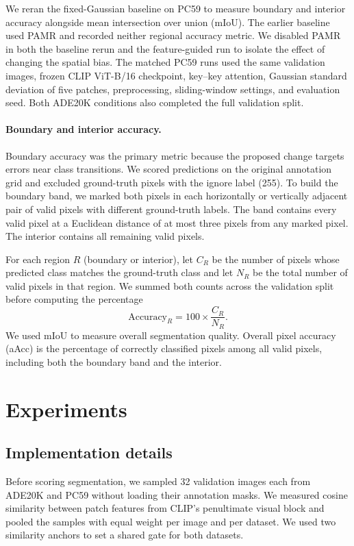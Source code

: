 We reran the fixed-Gaussian baseline on PC59 to measure boundary and interior
accuracy alongside mean intersection over union (mIoU). The earlier baseline
used PAMR and recorded neither regional accuracy metric. We disabled PAMR in
both the baseline rerun and the feature-guided run to isolate the effect of
changing the spatial bias. The matched PC59 runs used the same validation
images, frozen CLIP ViT-B/16 checkpoint, key--key attention, Gaussian standard
deviation of five patches, preprocessing, sliding-window settings, and
evaluation seed. Both ADE20K conditions also completed the full validation
split.

\paragraph{Boundary and interior accuracy.}
Boundary accuracy was the primary metric because the proposed change targets
errors near class transitions. We scored predictions on the original annotation
grid and excluded ground-truth pixels with the ignore label (255). To build the
boundary band, we marked both pixels in each horizontally or vertically
adjacent pair of valid pixels with different ground-truth labels. The band
contains every valid pixel at a Euclidean distance of at most three pixels from
any marked pixel. The interior contains all remaining valid pixels.

For each region $R$ (boundary or interior), let $C_R$ be the number of pixels
whose predicted class matches the ground-truth class and let $N_R$ be the
total number of valid pixels in that region. We summed both counts across the
validation split before computing the percentage
\[
    \mathrm{Accuracy}_{R} = 100 \times \frac{C_R}{N_R}.
\]
We used mIoU to measure overall segmentation quality. Overall pixel
accuracy (aAcc) is the percentage of correctly classified pixels among all
valid pixels, including both the boundary band and the interior.

\section{Experiments}
\subsection{Implementation details}
Before scoring segmentation, we sampled 32 validation images each from
ADE20K and PC59 without loading their annotation masks. We measured cosine
similarity between patch features from CLIP's penultimate visual block and
pooled the samples with equal weight per image and per dataset. We used two
similarity anchors to set a shared gate for both datasets.

